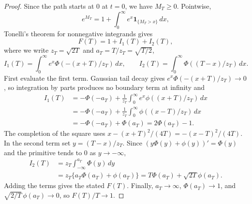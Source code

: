 \documentclass[a4paper,11pt]{article}
\theoremstyle{remark}
\begin{document}
\begin{proof}
Since the path starts at 0 at $t=0$, we have $M_T\ge0$. Pointwise,
\[
 e^{M_T}=1+\int_0^\infty e^x\mathbf1_{\{M_T>x\}}\,dx,
\]
Tonelli's theorem for nonnegative integrands gives
\[
 F(T)=1+I_1(T)+I_2(T),
\]
where we write $z_T=\sqrt{2T}$ and $a_T=T/z_T=\sqrt{T/2}$,
\[
 I_1(T)=\int_0^\infty e^x\Phi(-(x+T)/z_T)\,dx,
 \qquad I_2(T)=\int_0^\infty\Phi((T-x)/z_T)\,dx.
\]
First evaluate the first term. Gaussian tail decay gives
$e^x\Phi(-(x+T)/z_T)\to0$, so integration by parts produces no boundary term at infinity and
\begin{align*}
 I_1(T)
 &=-\Phi(-a_T)+\frac1{z_T}\int_0^\infty
 e^x\phi((x+T)/z_T)\,dx\\
 &=-\Phi(-a_T)+\frac1{z_T}\int_0^\infty
 \phi((x-T)/z_T)\,dx\\
 &=-\Phi(-a_T)+\Phi(a_T)=2\Phi(a_T)-1.
\end{align*}
The completion of the square uses
$x-(x+T)^2/(4T)=-(x-T)^2/(4T)$.
In the second term set $y=(T-x)/z_T$. Since
$(y\Phi(y)+\phi(y))'=\Phi(y)$ and the primitive tends to 0 as $y\to-\infty$,
\begin{align*}
 I_2(T)&=z_T\int_{-\infty}^{a_T}\Phi(y)\,dy\\
 &=z_T\{a_T\Phi(a_T)+\phi(a_T)\}
 =T\Phi(a_T)+\sqrt{2T}\phi(a_T).
\end{align*}
Adding the terms gives the stated $F(T)$. Finally, $a_T\to\infty$,
$\Phi(a_T)\to1$, and $\sqrt{2/T}\,\phi(a_T)\to0$, so $F(T)/T\to1$.
\end{proof}
\end{document}
